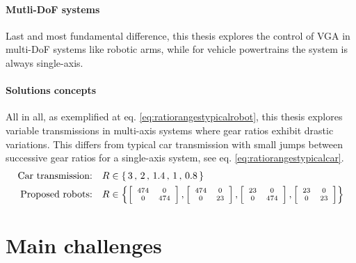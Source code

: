 \paragraph{Mutli-DoF systems}
%
Last and most fundamental difference, this thesis explores the control of VGA in multi-DoF systems like robotic arms, while for vehicle powertrains the system is always single-axis.

\paragraph{Solutions concepts}
%
All in all, as exemplified at eq. \eqref{eq:ratiorangestypicalrobot}, this thesis explores variable transmissions in multi-axis systems where gear ratios exhibit drastic variations. This differs from typical car transmission with small jumps between successive gear ratios for a single-axis system, see eq. \eqref{eq:ratiorangestypicalcar}.
%
\begin{align}
  \text{Car transmission:}& \quad R \in \{ \, 3 \, , \,  2 \, , \, 1.4 \, , \, 1 \, , \, 0.8 \, \} 
	\label{eq:ratiorangestypicalcar}
	\\
	\text{Proposed robots:}& \quad R \in 
	\scriptsize
	\left \{
	\left[
	\begin{array}{c c}
	474 & 0 \\ 0 & 474
	\end{array} 
	\right]
	,
	\left[
	\begin{array}{c c}
	474 & 0 \\ 0 & 23
	\end{array} 
	\right]
	,
	\left[
	\begin{array}{c c}
	23 & 0 \\ 0 & 474
	\end{array} 
	\right]
	,
	\left[
	\begin{array}{c c}
	23 & 0 \\ 0 & 23
	\end{array} 
	\right]
	\right \}
 \label{eq:ratiorangestypicalrobot}
\end{align}


\newpage

\section{Main challenges}
\label{sec:MainChallenges}

